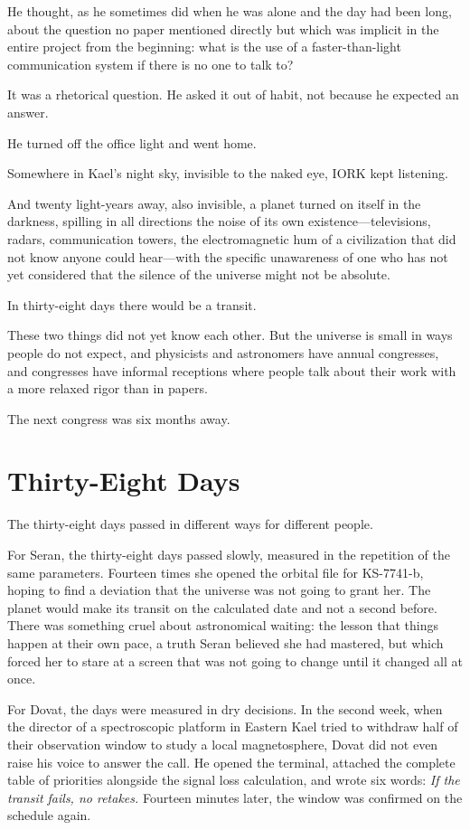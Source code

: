 \documentclass[11pt,a5paper,twoside]{book}
\begin{document}
He thought, as he sometimes did when he was alone and the day had been long, about the question no paper mentioned directly but which was implicit in the entire project from the beginning: what is the use of a faster-than-light communication system if there is no one to talk to?

It was a rhetorical question. He asked it out of habit, not because he expected an answer.

He turned off the office light and went home.

Somewhere in Kael’s night sky, invisible to the naked eye, IORK kept listening.

And twenty light-years away, also invisible, a planet turned on itself in the darkness, spilling in all directions the noise of its own existence—televisions, radars, communication towers, the electromagnetic hum of a civilization that did not know anyone could hear—with the specific unawareness of one who has not yet considered that the silence of the universe might not be absolute.

In thirty-eight days there would be a transit.

These two things did not yet know each other. But the universe is small in ways people do not expect, and physicists and astronomers have annual congresses, and congresses have informal receptions where people talk about their work with a more relaxed rigor than in papers.

The next congress was six months away.

\chapter{Thirty-Eight Days}

The thirty-eight days passed in different ways for different people.

For Seran, the thirty-eight days passed slowly, measured in the repetition of the same parameters. Fourteen times she opened the orbital file for KS-7741-b, hoping to find a deviation that the universe was not going to grant her. The planet would make its transit on the calculated date and not a second before. There was something cruel about astronomical waiting: the lesson that things happen at their own pace, a truth Seran believed she had mastered, but which forced her to stare at a screen that was not going to change until it changed all at once.

For Dovat, the days were measured in dry decisions. In the second week, when the director of a spectroscopic platform in Eastern Kael tried to withdraw half of their observation window to study a local magnetosphere, Dovat did not even raise his voice to answer the call. He opened the terminal, attached the complete table of priorities alongside the signal loss calculation, and wrote six words: \textit{If the transit fails, no retakes.} Fourteen minutes later, the window was confirmed on the schedule again.
\end{document}
